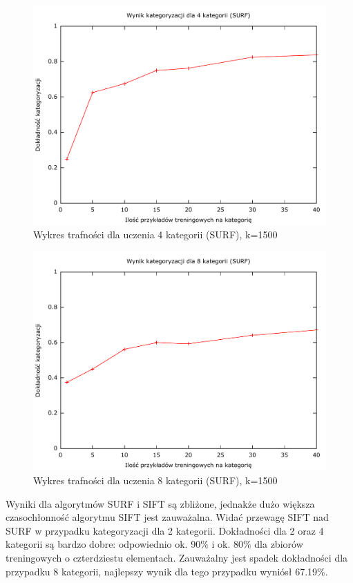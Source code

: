 \begin{figure}[h]
	\centering
	\includegraphics[scale=0.8]{graphics/04_interpretacja_wynikow/result-surf-4.pdf}
	\caption{ Wykres trafności dla uczenia 4 kategorii (SURF), k=1500 }
	\label{fig:result-surf-4}
\end{figure}

\begin{figure}[h]
	\centering
	\includegraphics[scale=0.8]{graphics/04_interpretacja_wynikow/result-surf-8.pdf}
	\caption{ Wykres trafności dla uczenia 8 kategorii (SURF), k=1500 }
	\label{fig:result-surf-8}
\end{figure}

Wyniki dla algorytmów SURF i SIFT są zbliżone, jednakże dużo większa czasochłonność algorytmu SIFT jest zauważalna. Widać przewagę SIFT nad SURF w przypadku kategoryzacji dla 2 kategorii. Dokładności dla 2 oraz 4 kategorii są bardzo dobre: odpowiednio ok. 90\% i ok. 80\% dla zbiorów treningowych o czterdziestu elementach. Zauważalny jest spadek dokładności dla przypadku 8 kategorii, najlepszy wynik dla tego przypadku wyniósł 67.19\%. 

